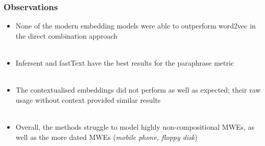 \documentclass{beamer}
\begin{document}

\begin{frame}
\frametitle{Observations}
\begin{itemize}
    \item None of the modern embedding models were able to outperform word2vec in the direct combination approach \\~\\
    \item Infersent and fastText have the best results for the paraphrase metric \\~\\
    \item The contextualised embeddings did not perform as well as expected; their raw usage without context provided similar results\\~\\
    \item Overall, the methods struggle to model highly non-compositional MWEs, as well as the more dated MWEs (\textit{mobile phone, floppy disk})
\end{itemize}
\end{frame}



\end{document}
